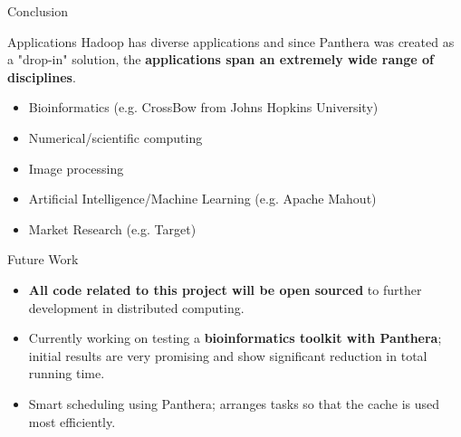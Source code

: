 \documentclass[final]{beamer} %
\begin{document}
\begin{frame}
\begin{columns}[t]
\begin{column}{0.32\textwidth}
\begin{block}{Conclusion}
	\end{block}
	
	\begin{block}{Applications}
	Hadoop has diverse applications and since Panthera was created as a "drop-in" solution, the \textbf{applications span an extremely wide range of disciplines}.
	\begin{itemize}
		\item Bioinformatics (e.g. CrossBow from Johns Hopkins University)
		\item Numerical/scientific computing 
		\item Image processing
		\item Artificial Intelligence/Machine Learning (e.g. Apache Mahout)
		\item Market Research (e.g. Target)
	\end{itemize}
	\end{block}
	
	\begin{block}{Future Work}
	\begin{itemize}
		\item \textbf{All code related to this project will be open sourced} to further development in distributed computing.
		\item Currently working on testing a \textbf{bioinformatics toolkit with Panthera}; initial results are very promising and show significant reduction in total running time.
		\item Smart scheduling using Panthera; arranges tasks so that the cache is used most efficiently.
		
	\end{itemize}
	\end{block}
      \end{column}
    \end{columns}
  \end{frame}
    
  
\end{document}
